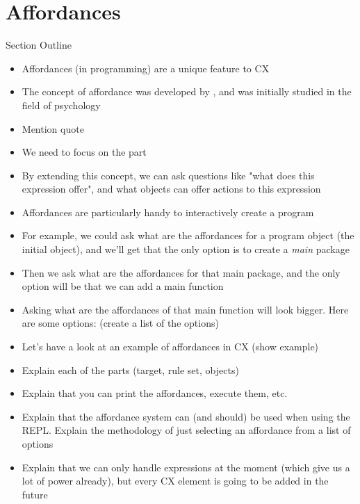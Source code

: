 \documentclass[11pt,fleqn,openany]{book} %
\begin{document}

\chapter{Affordances}
\label{chapter:affordances}

\begin{remark}
Section Outline
    \begin{itemize}
    	\item Affordances (in programming) are a unique feature to CX
        \item The concept of affordance was developed by \cite{gibson1966senses}, and was initially studied in the field of psychology
        \item Mention quote
        \item We need to focus on the part 
        \item By extending this concept, we can ask questions like "what does this expression offer", and what objects can offer actions to this expression
        \item Affordances are particularly handy to interactively create a program
        \item For example, we could ask what are the affordances for a program object (the initial object), and we'll get that the only option is to create a \textit{main} package
        \item Then we ask what are the affordances for that main package, and the only option will be that we can add a main function
        \item Asking what are the affordances of that main function will look bigger. Here are some options: (create a list of the options)
        \item Let's have a look at an example of affordances in CX (show example)
        \item Explain each of the parts (target, rule set, objects)
        \item Explain that you can print the affordances, execute them, etc.
        \item Explain that the affordance system can (and should) be used when using the REPL. Explain the methodology of just selecting an affordance from a list of options
        \item Explain that we can only handle expressions at the moment (which give us a lot of power already), but every CX element is going to be added in the future
    \end{itemize}
\end{remark}
\end{document}
